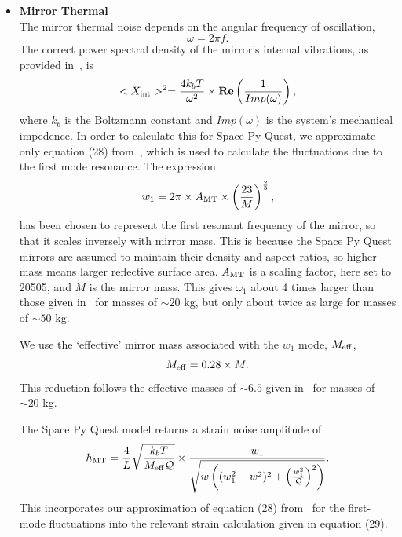 \documentclass{article}
\begin{document}
    \begin{itemize}
    \item \textbf{Mirror Thermal} \\
    The mirror thermal noise depends on the angular frequency of oscillation,
    \begin{equation}
    \omega = 2\pi f.
    \end{equation}
     The correct power spectral density of the mirror's internal
     vibrations, as provided in~\cite{Virgo-sens}, is
    \begin{equation}
    <X_{\rm int}>^2 = \frac{4k_bT}{\omega^2} \times\text{\textbf{Re}}\left(\frac{1}{Imp(\omega)}\right),
    \end{equation}
    where $k_b$ is the Boltzmann constant and $Imp(\omega)$ is the
    system's mechanical impedence. In order to calculate this for
    Space Py Quest, we  approximate only equation (28)
    from~\cite{Virgo-sens}, which is used to calculate the
    fluctuations due to
    the first mode resonance. The expression
    \begin{equation}
    w_1 = 2\pi \times A_{\rm MT} \times \left(\frac{23}{M}\right)^{\frac{2}{3}}, 
    \end{equation}
    has been chosen to represent the first resonant frequency of the
    mirror, so that it scales inversely with mirror mass. This is
    because the Space Py Quest mirrors are assumed to maintain their
    density and aspect ratios, so higher mass means larger reflective
    surface area. $A_{\rm MT}$ is a scaling factor, here set to 20505, and
    $M$ is the mirror mass. This gives $\omega_1$ about 4 times larger
    than those given in~\cite{Virgo-sens} for masses of $\sim 20$ kg, but
    only about twice as large for masses of $\sim 50$ kg. 

    We use the `effective' mirror mass associated with the $w_1$ mode, $M_{\rm eff}$,
    \begin{equation}
    M_{\rm eff} = 0.28\times M.
    \end{equation}
    This reduction follows the effective masses of $\sim 6.5$ given
    in~\cite{Virgo-sens} for masses of $\sim 20$ kg.
    
    The Space Py Quest model returns a strain noise amplitude of
    \begin{equation}
    \label{eqn::mirror}
     h_{\rm MT} =  \frac{4}{L}\sqrt{\frac{k_bT}{M_{\rm eff}\mathcal{Q}}}\times\frac{w_1}{\sqrt{w\left((w_1^2 - w^2)^2 + \left(\frac{w_1^2}{\mathcal{Q}}\right)^2\right)}}.
    \end{equation}
    This incorporates our approximation of equation (28)
    from~\cite{Virgo-sens} for the first-mode fluctuations into the
    relevant
    strain calculation given in equation (29).
    

\end{itemize}
\end{document}
